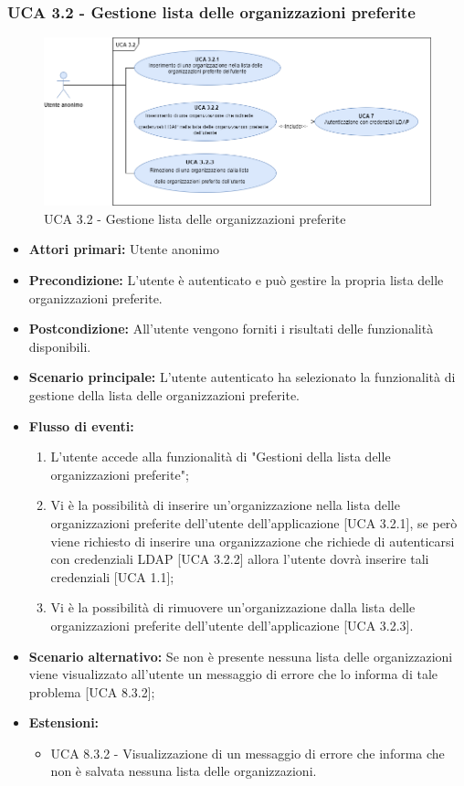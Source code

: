 \subsubsection{UCA 3.2 - Gestione lista delle organizzazioni preferite}%
\begin{figure}[h]
	\centering
	\includegraphics[scale=0.45 , center]{Sezioni/UseCase/Immagini/UCA3.2.png}
	\caption{UCA 3.2 - Gestione lista delle organizzazioni preferite}
\end{figure}
\begin{itemize}
	\item \textbf{Attori primari:} Utente anonimo
	\item \textbf{Precondizione:} L'utente è autenticato e può gestire la propria lista delle organizzazioni preferite.
	\item \textbf{Postcondizione:} All'utente vengono forniti i risultati delle funzionalità disponibili.
	\item \textbf{Scenario principale:} L'utente autenticato ha selezionato la funzionalità di gestione della lista delle organizzazioni preferite.
	\item \textbf{Flusso di eventi:}
			\begin{enumerate}
			\item L'utente accede alla funzionalità di "Gestioni della lista delle organizzazioni\ap{G} preferite";
			\item Vi è la possibilità di inserire un'organizzazione nella lista delle organizzazioni\ap{G} preferite dell'utente dell'applicazione [UCA 3.2.1], se però viene richiesto di inserire una organizzazione che richiede di autenticarsi con credenziali LDAP [UCA 3.2.2] allora l'utente dovrà inserire tali credenziali [UCA 1.1];
			\item Vi è la possibilità di rimuovere un'organizzazione dalla lista delle organizzazioni\ap{G} preferite dell'utente dell'applicazione [UCA 3.2.3].
			\end{enumerate}
	\item \textbf{Scenario alternativo:} Se non è presente nessuna lista delle organizzazioni viene visualizzato all'utente un messaggio di errore che lo informa di tale problema [UCA 8.3.2];
	\item \textbf{Estensioni:}
	\begin{itemize}
		\item UCA 8.3.2 - Visualizzazione di un messaggio di errore che informa che non è salvata nessuna lista delle organizzazioni.
	\end{itemize}
\end{itemize}

